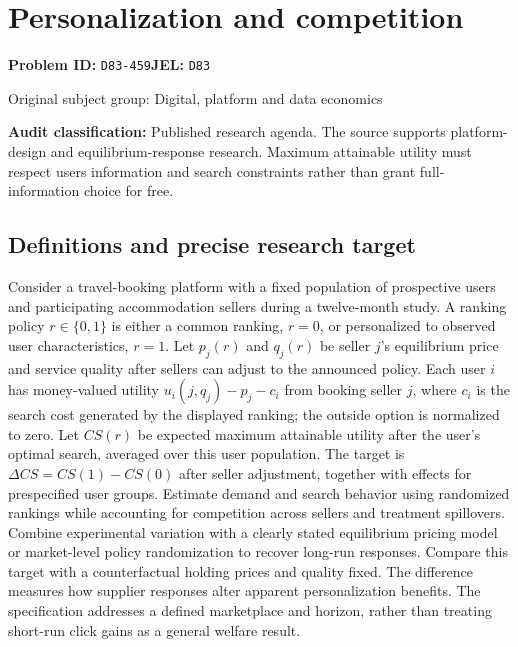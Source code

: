 \documentclass[11pt,a4paper]{article}
\begin{document}
\section*{Personalization and competition}
\textbf{Problem ID:} \texttt{D83-459}\quad \textbf{JEL:} \texttt{D83}\par
\label{problem:OP-0400}
{\sffamily\small\color{muted}Original subject group: Digital, platform and data economics\par}
\label{definitions:problem:30007682}
\textbf{Audit classification:} Published research agenda. The source supports platform-design and equilibrium-response research. Maximum attainable utility must respect users information and search constraints rather than grant full-information choice for free.
\subsection*{Definitions and precise research target}
Consider a travel-booking platform with a fixed population of prospective users and participating accommodation sellers during a twelve-month study. A ranking policy \(r\in\{0,1\}\) is either a common ranking, \(r=0\), or personalized to observed user characteristics, \(r=1\). Let \(p_j(r)\) and \(q_j(r)\) be seller \(j\)'s equilibrium price and service quality after sellers can adjust to the announced policy. Each user \(i\) has money-valued utility \(u_i(j,q_j)-p_j-c_i\) from booking seller \(j\), where \(c_i\) is the search cost generated by the displayed ranking; the outside option is normalized to zero. Let \(CS(r)\) be expected maximum attainable utility after the user's optimal search, averaged over this user population. The target is \(\Delta CS=CS(1)-CS(0)\) after seller adjustment, together with effects for prespecified user groups. Estimate demand and search behavior using randomized rankings while accounting for competition across sellers and treatment spillovers. Combine experimental variation with a clearly stated equilibrium pricing model or market-level policy randomization to recover long-run responses. Compare this target with a counterfactual holding prices and quality fixed. The difference measures how supplier responses alter apparent personalization benefits. The specification addresses a defined marketplace and horizon, rather than treating short-run click gains as a general welfare result.
\end{document}

